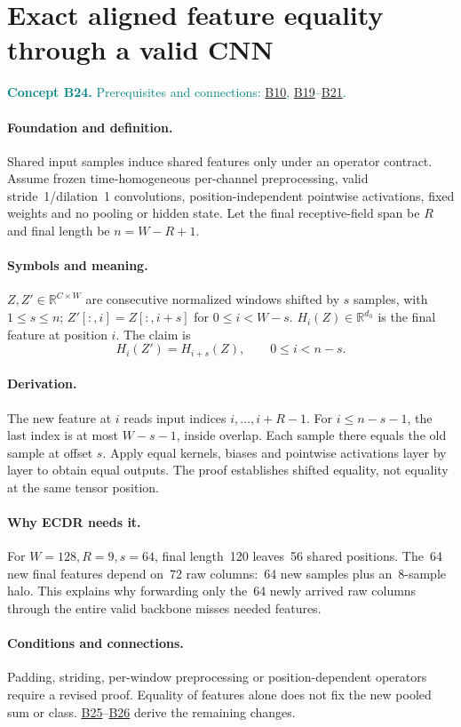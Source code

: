 \documentclass[11pt,a4paper]{article}
\newcommand{\R}{\mathbb R}
\newcommand{\conceptid}{Front matter}
\newcommand{\concept}[3]{\clearpage\renewcommand{\conceptid}{#1}%
\section{#2}\label{concept:#1}%
\textcolor{teal}{\textbf{Concept #1.} Prerequisites and connections: #3.}\par
\typeout{ECDR-CONCEPT-START #1 PAGE=\thepage}}
\begin{document}
\concept{B24}{Exact aligned feature equality through a valid CNN}{\hyperref[concept:B10]{B10}, \hyperref[concept:B19]{B19}--\hyperref[concept:B21]{B21}}
\paragraph{Foundation and definition.}
Shared input samples induce shared features only under an operator contract.
Assume frozen time-homogeneous per-channel preprocessing, valid stride~1/dilation~1 convolutions,
position-independent pointwise activations, fixed weights and no pooling
or hidden state. Let the final receptive-field span be $R$ and final
length be $n=W-R+1$.
\paragraph{Symbols and meaning.}
$Z,Z'\in\R^{C\times W}$ are consecutive normalized windows shifted by
$s$ samples, with $1\le s\le n$;
$Z'[:,i]=Z[:,i+s]$ for $0\le i<W-s$.
$H_i(Z)\in\R^{d_h}$ is the final feature at position $i$.
The claim is
\[
 H_i(Z')=H_{i+s}(Z),\qquad 0\le i<n-s.
\]
\paragraph{Derivation.}
The new feature at $i$ reads input indices $i,\ldots,i+R-1$.
For $i\le n-s-1$, the last index is at most $W-s-1$, inside overlap.
Each sample there equals the old sample at offset $s$. Apply equal
kernels, biases and pointwise activations layer by layer to obtain equal
outputs. The proof establishes shifted equality, not equality at the same
tensor position.
\paragraph{Why ECDR needs it.}
For $W=128,R=9,s=64$, final length~120 leaves~56 shared positions.
The~64 new final features depend on~72 raw columns:~64 new samples plus
an~8-sample halo. This explains why forwarding only the~64 newly arrived
raw columns through the entire valid backbone misses needed features.
\paragraph{Conditions and connections.}
Padding, striding, per-window preprocessing or position-dependent operators
require a revised proof. Equality of features alone does not fix the
new pooled sum or class. \hyperref[concept:B25]{B25}--\hyperref[concept:B26]{B26} derive the remaining changes.
\par\label{endconcept:B24}
\end{document}
